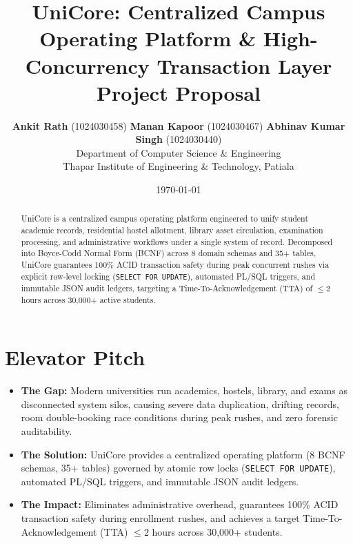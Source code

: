 \documentclass[11pt,a4paper]{article}
\title{\textbf{UniCore: Centralized Campus Operating Platform \& High-Concurrency Transaction Layer}\\ \Large Project Proposal}
\author{\textbf{Ankit Rath} (1024030458) \quad \textbf{Manan Kapoor} (1024030467) \quad \textbf{Abhinav Kumar Singh} (1024030440)\\
\small Department of Computer Science \& Engineering\\
\small Thapar Institute of Engineering \& Technology, Patiala}
\date{\today}
\begin{document}
\maketitle

\begin{abstract}
UniCore is a centralized campus operating platform engineered to unify student academic records, residential hostel allotment, library asset circulation, examination processing, and administrative workflows under a single system of record. Decomposed into Boyce-Codd Normal Form (BCNF) across 8 domain schemas and 35+ tables, UniCore guarantees 100\% ACID transaction safety during peak concurrent rushes via explicit row-level locking (\texttt{SELECT FOR UPDATE}), automated PL/SQL triggers, and immutable JSON audit ledgers, targeting a Time-To-Acknowledgement (TTA) of $\le 2$ hours across 30,000+ active students.
\end{abstract}

\section{Elevator Pitch}
\begin{itemize}[leftmargin=*]
    \item \textbf{The Gap:} Modern universities run academics, hostels, library, and exams as disconnected system silos, causing severe data duplication, drifting records, room double-booking race conditions during peak rushes, and zero forensic auditability.
    \item \textbf{The Solution:} UniCore provides a centralized operating platform (8 BCNF schemas, 35+ tables) governed by atomic row locks (\texttt{SELECT FOR UPDATE}), automated PL/SQL triggers, and immutable JSON audit ledgers.
    \item \textbf{The Impact:} Eliminates administrative overhead, guarantees 100\% ACID transaction safety during enrollment rushes, and achieves a target Time-To-Acknowledgement (TTA) $\le 2$ hours across 30,000+ students.
\end{itemize}
\end{document}
